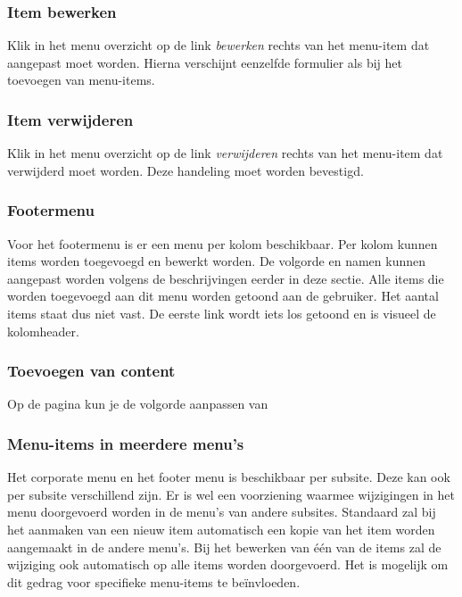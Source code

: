 \subsubsection{Item bewerken}
Klik in het menu overzicht op de link \emph{bewerken} rechts van het menu-item dat aangepast moet worden. Hierna verschijnt eenzelfde formulier als bij het toevoegen van menu-items.

\subsubsection{Item verwijderen}
Klik in het menu overzicht op de link \emph{verwijderen} rechts van het menu-item dat verwijderd moet worden. Deze handeling moet worden bevestigd.

\subsubsection{Footermenu}
Voor het footermenu is er een menu per kolom beschikbaar. Per kolom kunnen items worden toegevoegd en bewerkt worden. De volgorde en namen kunnen aangepast worden volgens de beschrijvingen eerder in deze sectie. Alle items die worden toegevoegd aan dit menu worden getoond aan de gebruiker. Het aantal items staat dus niet vast. De eerste link wordt iets los getoond en is visueel de kolomheader.

\subsubsection{Toevoegen van content}
Op de pagina  kun je de volgorde aanpassen van 

\subsubsection{Menu-items in meerdere menu's}\label{menumultishizzle}
Het corporate menu en het footer menu is beschikbaar per subsite. Deze kan ook per subsite verschillend zijn. Er is wel een voorziening waarmee wijzigingen in het menu doorgevoerd worden in de menu's van andere subsites. Standaard zal bij het aanmaken van een nieuw item automatisch een kopie van het item worden aangemaakt in de andere menu's. Bij het bewerken van \'{e}\'{e}n van de items zal de wijziging ook automatisch op alle items worden doorgevoerd. Het is mogelijk om dit gedrag voor specifieke menu-items te be\"{i}nvloeden.


